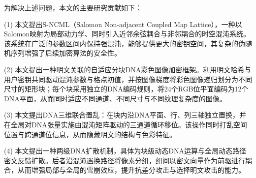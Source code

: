 为解决上述问题，本文的主要研究贡献如下：

(1) 本文提出S-NCML（Salomon Non-adjacent Coupled Map Lattice），一种以Salomon映射为局部动力学、同时引入近邻余弦耦合与非邻耦合的时空混沌系统。该系统在广泛的参数区间内保持强混沌，能够提供更大的密钥空间，其复杂的伪随机序列增强了后续加密算法的安全性。

(2) 本文提出一种明文关联的自适应分块DNA彩色图像加密框架。利用明文哈希与用户密钥共同驱动混沌参数与格点初值，并按图像梯度将彩色图像递归划分为不同尺寸的矩形块；每个块采用独立的DNA编码规则，将24个RGB位平面编码为12个DNA平面，从而同时适应不同通道、不同尺寸与不同纹理复杂度的图像。

(3) 本文提出DNA三维联合置乱：在块内沿DNA平面、行、列三轴独立置换，并在全局对DNA张量实施由混沌矩阵驱动的三通道循环移位。该操作同时打乱空间位置与跨通道位信息，从而隐藏明文的结构与色彩特征。

(4) 本文提出一种两级DNA扩散机制，具体为块级动态DNA运算与全局动态路径密文反馈扩散。后者沿混沌置换路径将像素分组，组间以密文向量作为前驱进行耦合，从而增强局部与全局的雪崩效应，提升抗差分攻击与选择明文攻击的能力。
